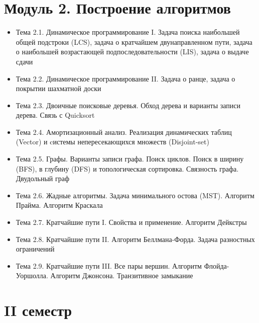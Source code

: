 \documentclass[a4paper,11pt]{article}
\begin{document}
\section*{Модуль 2. Построение алгоритмов}
\begin{itemize}
\item Тема 2.1. Динамическое программирование I. Задача поиска наибольшей
общей подстроки (LCS), задача о кратчайшем двунаправленном пути, задача о
наибольшей возрастающей подпоследовательности (LIS), задача о выдаче сдачи
\item Тема 2.2. Динамическое программирование II. Задача о ранце, задача о
покрытии шахматной доски
\item Тема 2.3. Двоичные поисковые деревья. Обход дерева и варианты записи
дерева. Связь с Quicksort
\item Тема 2.4. Амортизационный анализ. Реализация динамических таблиц
(Vector) и cистемы непересекающихся множеств (Disjoint-set)
\item Тема 2.5. Графы. Варианты записи графа. Поиск циклов. Поиск в ширину
(BFS), в глубину (DFS) и топологическая сортировка. Связность графа. Двудольный
граф
\item Тема 2.6. Жадные алгоритмы. Задача минимального остова (MST). Алгоритм
Прайма. Алгоритм Краскала
\item Тема 2.7. Кратчайшие пути I. Свойства и применение. Алгоритм Дейкстры
\item Тема 2.8. Кратчайшие пути II. Алгоритм Беллмана-Форда. Задача разностных
ограничений
\item Тема 2.9. Кратчайшие пути III. Все пары вершин. Алгоритм Флойда-Уоршолла.
Алгоритм Джонсона. Транзитивное замыкание
\end{itemize}

\section*{II семестр}
\end{document}
